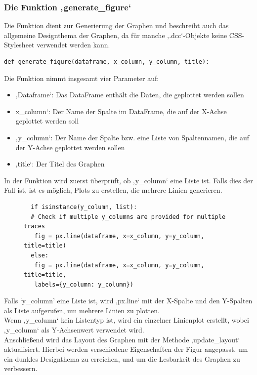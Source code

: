 \subsubsection{Die Funktion ‚generate\_figure‘}
Die Funktion dient zur Generierung der Graphen und beschreibt auch das allgemeine Designthema der Graphen, da für manche ‚.dcc‘-Objekte keine CSS-Stylesheet verwendet werden kann.
\begin{verbatim}
def generate_figure(dataframe, x_column, y_column, title):
\end{verbatim}
\newpage
Die Funktion nimmt insgesamt vier Parameter auf: 
\begin{itemize}
    \item ‚Dataframe‘: Das DataFrame enthält die Daten, die geplottet werden sollen 
    \item x\_column‘: Der Name der Spalte im DataFrame, die auf der X-Achse geplottet werden soll
    \item ‚y\_column‘: Der Name der Spalte bzw. eine Liste von Spaltennamen, die auf der Y-Achse geplottet werden sollen
    \item ‚title‘: Der Titel des Graphen 
\end{itemize}
In der Funktion wird zuerst überprüft, ob ‚y\_column‘ eine Liste ist. Falls dies der Fall ist, ist es möglich, Plots zu erstellen, die mehrere Linien generieren. \\
\vspace{3mm}
\begin{figure}[H]
    \centering
    \begin{verbatim}
  if isinstance(y_column, list):  
  # Check if multiple y_columns are provided for multiple traces
   fig = px.line(dataframe, x=x_column, y=y_column, title=title)
  else:
   fig = px.line(dataframe, x=x_column, y=y_column, title=title,
   labels={y_column: y_column})
    \end{verbatim}
\end{figure}
\vspace{3mm}
Falls ‘y\_column’ eine Liste ist, wird ‚px.line‘ mit der X-Spalte und den Y-Spalten als Liste aufgerufen, um mehrere Linien zu plotten.\\
\vspace{3mm}
Wenn ‚y\_column‘ kein Listentyp ist, wird ein einzelner Linienplot erstellt, wobei ‚y\_column‘ als Y-Achsenwert verwendet wird.\\
\vspace{3mm}
Anschließend wird das Layout des Graphen mit der Methode ‚update\_layout‘ aktualisiert. Hierbei werden verschiedene Eigenschaften der Figur angepasst, um ein dunkles Designthema zu erreichen, und um die Lesbarkeit des Graphen zu verbessern. \\
